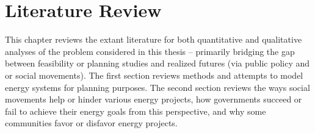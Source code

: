 \chapter{Literature Review}

This chapter reviews the extant literature for both quantitative and qualitative
analyses of the problem considered in this thesis -- primarily bridging the gap 
between feasibility or planning studies and realized futures (via public policy and or 
social movements). The first section reviews methods and attempts to model energy 
systems for planning purposes. The second section reviews the ways social movements 
help or hinder various energy projects, how governments succeed or fail to achieve 
their energy goals from this perspective, and why some communities favor or disfavor
energy projects.

